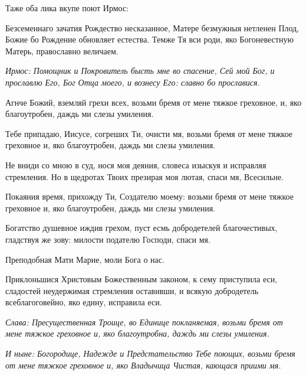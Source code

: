 \itshape 

Таже оба лика вкупе поют Ирмос\normalfont{}:

Безсеменнаго зачатия Рождество несказанное, Матере безмужныя нетленен Плод, Божие бо Рождение обновляет естества. Темже Тя вси роди, яко Богоневестную Матерь, православно величаем.

 

\mychapterending

 



\itshape Ирмос\normalfont{}: Помощник и Покровитель бысть мне во спасение, Сей мой Бог, и прославлю Его, Бог Отца моего, и вознесу Его: славно бо прославися. 

Агнче Божий, вземляй грехи всех, возьми бремя от мене тяжкое греховное, и, яко благоутробен, даждь ми слезы умиления. 

Тебе припадаю, Иисусе, согреших Ти, очисти мя, возьми бремя от мене тяжкое греховное и, яко благоутробен, даждь ми слезы умиления. 

Не вниди со мною в суд, нося моя деяния, словеса изыскуя и исправляя стремления. Но в щедротах Твоих презирая моя лютая, спаси мя, Всесильне. 

Покаяния время, прихожду Ти, Создателю моему: возьми бремя от мене тяжкое греховное и, яко благоутробен, даждь ми слезы умиления. 

Богатство душевное иждив грехом, пуст есмь добродетелей благочестивых, гладствуя же зову: милости подателю Господи, спаси мя. 

\bfseries 

Преподобная Мати Марие, моли Бога о нас.

\normalfont{}

Приклоньшися Христовым Божественным законом, к сему приступила еси, сладостей неудержимая стремления оставивши, и всякую добродетель всеблагоговейно, яко едину, исправила еси. 

\itshape Слава\normalfont{}: Пресущественная Троице, во Единице покланяемая, возьми бремя от мене тяжкое греховное и, яко благоутробна, даждь ми слезы умиления. 

\itshape И ныне\normalfont{}: Богородице, Надежде и Предстательство Тебе поющих, возьми бремя от мене тяжкое греховное и, яко Владычица Чистая, кающася приими мя. 



